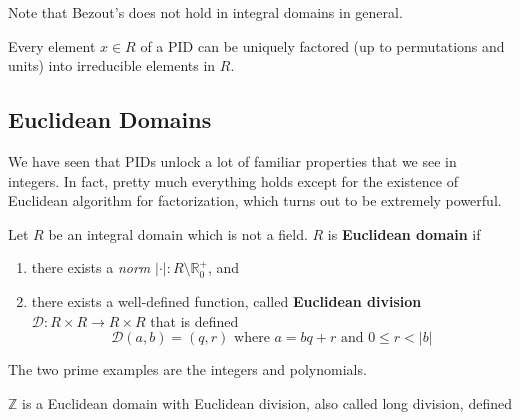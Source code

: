   Note that Bezout's does not hold in integral domains in general. 
  
  \begin{example}
    
  \end{example}

  \begin{theorem}
    Every element $x \in R$ of a PID can be uniquely factored (up to permutations and units) into irreducible elements in $R$. 
  \end{theorem}

\subsection{Euclidean Domains}

  We have seen that PIDs unlock a lot of familiar properties that we see in integers. In fact, pretty much everything holds except for the existence of Euclidean algorithm for factorization, which turns out to be extremely powerful. 

  \begin{definition}
    Let $R$ be an integral domain which is not a field. $R$ is \textbf{Euclidean domain} if 
    \begin{enumerate}
      \item there exists a \textit{norm} $|\cdot|: R \setminus \mathbb{R}_0^+$, and  
      \item there exists a well-defined function, called \textbf{Euclidean division} $\mathcal{D}: R \times R \rightarrow R \times R$ that is defined 
      \begin{equation}
        \mathcal{D}(a, b) = (q, r) \text{ where } a = bq + r \text{ and } 0 \leq r < |b|
      \end{equation}
    \end{enumerate}
  \end{definition}

  The two prime examples are the integers and polynomials. 

  \begin{example}[Integers]
    $\mathbb{Z}$ is a Euclidean domain with Euclidean division, also called long division, defined 

    \begin{center}
    \end{center}
  \end{example}

